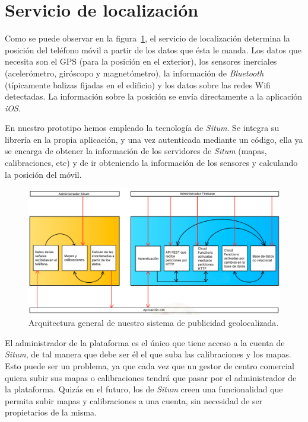 \section{Servicio de localización}
Como se puede observar en la figura~\ref{fig:arquitectura}, el servicio de localización determina la posición del teléfono móvil a partir de los datos que ésta le manda.
Los datos que necesita son el GPS (para la posición en el exterior), los sensores inerciales (acelerómetro, giróscopo y magnetómetro), la información de \emph{Bluetooth} (típicamente balizas fijadas en el edificio) y los datos sobre las redes Wifi detectadas. 
La información sobre la posición se envía directamente a la aplicación \emph{iOS}.

En nuestro prototipo hemos empleado la tecnología de \textit{Situm}.
Se integra su librería en la propia aplicación, y una vez autenticada mediante un código, ella ya se encarga de obtener la información de los servidores de \emph{Situm} (mapas, calibraciones, etc) y de ir obteniendo la información de los sensores y calculando la posición del móvil.


\begin{figure}[tbp]
\centering
\includegraphics[width=\textwidth]{figures/Untitled2.png}
\caption{Arquitectura general de nuestro sistema de publicidad geolocalizada.\label{fig:arquitectura}}
\end{figure}

El administrador de la plataforma es el único que tiene acceso a la cuenta de \textit{Situm}, de tal manera que debe ser él el que suba las calibraciones y los mapas. Esto puede ser un problema, ya que cada vez que un gestor de centro comercial quiera subir sus mapas o calibraciones tendrá que pasar por el administrador de la plataforma. Quizás en el futuro, los de \textit{Situm} creen una funcionalidad que permita subir mapas y calibraciones a una cuenta, sin necesidad de ser propietarios de la misma.



